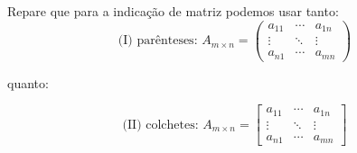 Repare que para a indicação de matriz podemos usar tanto:
$$
\text{(I) parênteses: } A_{m \times n}=
\begin{pmatrix}
    a_{11} & \cdots & a_{1n} \\
    \vdots & \ddots & \vdots \\
    a_{n1} & \cdots & a_{mn}
\end{pmatrix}
$$

quanto:

$$
\text{(II) colchetes: }A_{m \times n}= \begin{bmatrix}
    a_{11} & \cdots & a_{1n} \\
    \vdots & \ddots & \vdots \\
    a_{n1} & \cdots & a_{mn}
\end{bmatrix}
$$